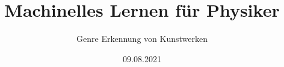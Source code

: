 

\title{Machinelles Lernen für Physiker}
\subtitle{Genre Erkennung von Kunstwerken}
\date{%
  09.08.2021
}



\maketitle
\thispagestyle{empty}
{\renewcommand*\normalfont{}%
\normalfont%
\tableofcontents}
\newpage








\printbibliography{}


